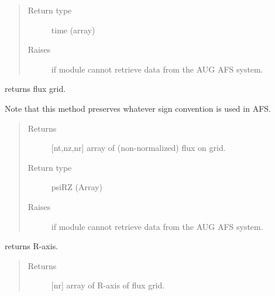 \documentclass[letterpaper,10pt,english]{sphinxmanual}
\begin{document}
\begin{fulllineitems}
\begin{fulllineitems}
\begin{quote}
\begin{description}
\item[{Return type}] \leavevmode
time (array)

\item[{Raises}] \leavevmode
{} \textendash{} if module cannot retrieve data from the AUG AFS system.

\end{description}\end{quote}

\end{fulllineitems}


\begin{fulllineitems}
\label{\detokenize{eqtools:eqtools.AUGData.AUGDDData.getFluxGrid}}
returns flux grid.

Note that this method preserves whatever sign convention is used in AFS.
\begin{quote}\begin{description}
\item[{Returns}] \leavevmode
{[}nt,nz,nr{]} array of (non-normalized) flux on grid.

\item[{Return type}] \leavevmode
psiRZ (Array)

\item[{Raises}] \leavevmode
{} \textendash{} if module cannot retrieve data from the AUG AFS system.

\end{description}\end{quote}

\end{fulllineitems}


\begin{fulllineitems}
\label{\detokenize{eqtools:eqtools.AUGData.AUGDDData.getRGrid}}
returns R-axis.
\begin{quote}\begin{description}
\item[{Returns}] \leavevmode
{[}nr{]} array of R-axis of flux grid.


\end{description}
\end{quote}
\end{fulllineitems}
\end{fulllineitems}
\end{document}
